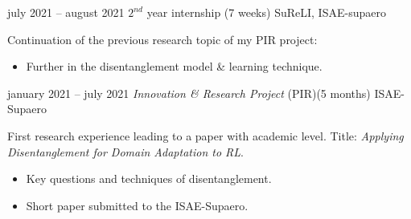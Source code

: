 \documentclass[
    a4paper,
]{fortysecondscv}
\begin{document}
\begin{cvtable}[4]
{                }
            \cvitem
                {july 2021 -- august 2021}
                {$2^{nd}$ year internship \newline (7 weeks)}
                {SuReLI, ISAE-supaero}
                {
                    Continuation of the previous research topic of my PIR project:
                    \begin{itemize}
                        \item Further in the disentanglement model \& learning technique.
                    \end{itemize}
                }
            \cvitem
                {january 2021 -- july 2021}
                {\textit{Innovation \& Research Project} (PIR)\newline (5 months)}
                {ISAE-Supaero}
                {
                    First research experience leading to a paper with academic level.\newline
                    Title: \textit{Applying Disentanglement for Domain Adaptation to RL}.
                    \begin{itemize}
                        \item Key questions and techniques of disentanglement.
                        \item Short paper submitted to the ISAE-Supaero.
                    \end{itemize}
                }
        \end{cvtable}
\end{document}
